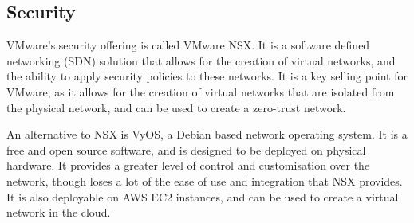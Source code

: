 \subsection{Security}

VMware's security offering is called VMware NSX. It is a software defined networking (SDN) solution that allows for the creation of virtual networks, and the ability to apply security policies to these networks. It is a key selling point for VMware, as it allows for the creation of virtual networks that are isolated from the physical network, and can be used to create a zero-trust network.

An alternative to NSX is VyOS, a Debian based network operating system. It is a free and open source software, and is designed to be deployed on physical hardware. It provides a greater level of control and customisation over the network, though loses a lot of the ease of use and integration that NSX provides. It is also deployable on AWS EC2 instances, and can be used to create a virtual network in the cloud.
